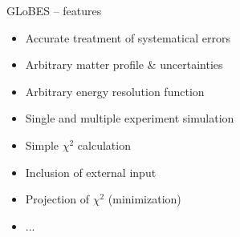 \documentclass[pdf,ps2pdf,azure,slideColor,colorBG]{prosper}
\begin{document}
\begin{slide}{GLoBES -- features}

\begin{itemize}
\item Accurate treatment of systematical errors
\item Arbitrary matter profile \& uncertainties
\item Arbitrary energy resolution function
\item Single and multiple experiment simulation
\item Simple $\chi^2$ calculation
\item Inclusion of external input
\item Projection of $\chi^2$ (minimization)
\item ...
\end{itemize}
\end{slide}
\end{document}
